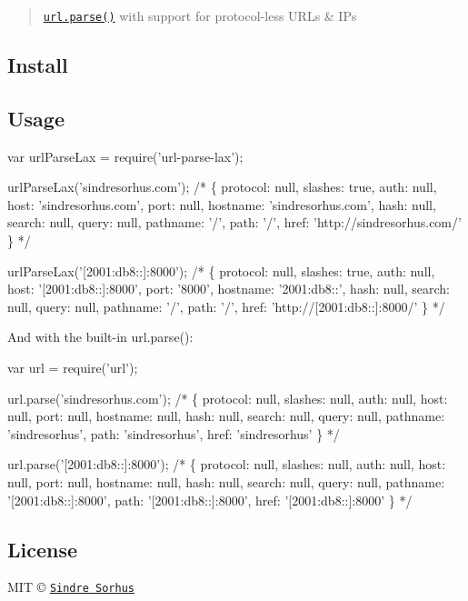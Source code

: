 \begin{quote}
\href{https://nodejs.org/docs/latest/api/url.html#url_url_parse_urlstr_parsequerystring_slashesdenotehost}{\tt {\ttfamily url.\+parse()}} with support for protocol-\/less U\+R\+Ls \& I\+Ps \end{quote}


\subsection*{Install}




\subsection*{Usage}


\begin{DoxyCode}
var urlParseLax = require('url-parse-lax');

urlParseLax('sindresorhus.com');
/*
\{
    protocol: null,
    slashes: true,
    auth: null,
    host: 'sindresorhus.com',
    port: null,
    hostname: 'sindresorhus.com',
    hash: null,
    search: null,
    query: null,
    pathname: '/',
    path: '/',
    href: 'http://sindresorhus.com/'
\}
*/

urlParseLax('[2001:db8::]:8000');
/*
\{
    protocol: null,
    slashes: true,
    auth: null,
    host: '[2001:db8::]:8000',
    port: '8000',
    hostname: '2001:db8::',
    hash: null,
    search: null,
    query: null,
    pathname: '/',
    path: '/',
    href: 'http://[2001:db8::]:8000/'
\}
*/
\end{DoxyCode}


And with the built-\/in {\ttfamily url.\+parse()}\+:


\begin{DoxyCode}
var url = require('url');

url.parse('sindresorhus.com');
/*
\{
    protocol: null,
    slashes: null,
    auth: null,
    host: null,
    port: null,
    hostname: null,
    hash: null,
    search: null,
    query: null,
    pathname: 'sindresorhus',
    path: 'sindresorhus',
    href: 'sindresorhus'
\}
*/

url.parse('[2001:db8::]:8000');
/*
\{
    protocol: null,
    slashes: null,
    auth: null,
    host: null,
    port: null,
    hostname: null,
    hash: null,
    search: null,
    query: null,
    pathname: '[2001:db8::]:8000',
    path: '[2001:db8::]:8000',
    href: '[2001:db8::]:8000'
\}
*/
\end{DoxyCode}


\subsection*{License}

M\+IT © \href{http://sindresorhus.com}{\tt Sindre Sorhus} 